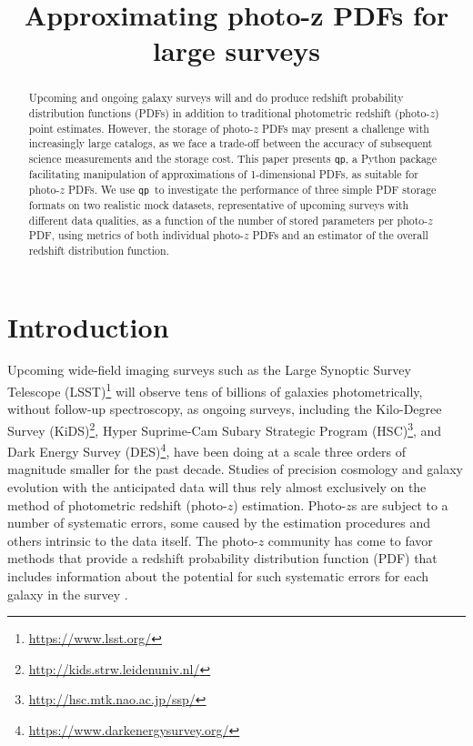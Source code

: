 \documentclass[\docopts]{\docclass}
\newcommand{\qp}{\texttt{qp}}
\newcommand{\pz}{photo-$z$ PDF}
\begin{document}
\title{ Approximating photo-z PDFs for large surveys }


\begin{abstract}

Upcoming and ongoing galaxy surveys will and do produce redshift probability 
distribution functions (PDFs) in addition to traditional photometric redshift 
(photo-$z$) point estimates.
However, the storage of \pz s may present a challenge with increasingly large 
catalogs, as we face a trade-off between the accuracy of subsequent science 
measurements and the storage cost.
This paper presents \qp, a Python package facilitating manipulation of 
approximations of 1-dimensional PDFs, as suitable for \pz s.
We use \qp\ to investigate the performance of three simple PDF storage formats 
on two realistic mock datasets, representative of upcoming surveys with 
different data qualities, as a function of the number of stored parameters per 
\pz, using metrics of both individual \pz s and an estimator of the overall 
redshift distribution function.

\end{abstract}


\maketitlepost





\section{Introduction}
\label{sec:intro}


Upcoming wide-field imaging surveys such as the Large Synoptic Survey Telescope 
(LSST)\footnote{\url{https://www.lsst.org/}}\citep{ivezic_lsst:_2008} will 
observe tens of billions of galaxies photometrically, without follow-up 
spectroscopy, as ongoing surveys, including the Kilo-Degree Survey 
(KiDS)\footnote{\url{http://kids.strw.leidenuniv.nl/}}, Hyper Suprime-Cam 
Subary Strategic Program (HSC)\footnote{\url{http://hsc.mtk.nao.ac.jp/ssp/}}, 
and Dark Energy Survey (DES)\footnote{\url{https://www.darkenergysurvey.org/}}, 
have been doing at a scale three orders of magnitude smaller for the past 
decade.
Studies of precision cosmology and galaxy evolution with the anticipated data 
will thus rely almost exclusively on the method of photometric redshift 
(photo-$z$) estimation.
Photo-$z$s are subject to a number of systematic errors, some caused by the 
estimation procedures and others intrinsic to the data itself.
The photo-$z$ community has come to favor methods that provide a redshift 
probability distribution function (PDF) that includes information about the 
potential for such systematic errors for each galaxy in the survey 
\citep{tanaka_photometric_2017, jong_third_2017, sheldon_photometric_2012}.
\end{document}
